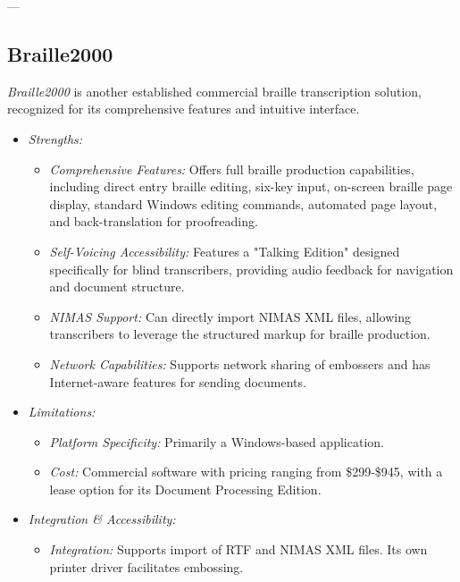 ---

\subsection{Braille2000}
\emph{Braille2000} is another established commercial braille transcription solution, recognized for its comprehensive features and intuitive interface.

\begin{itemize}
    \item \emph{Strengths:}
    \begin{itemize}
        \item \emph{Comprehensive Features:} Offers full braille production capabilities, including direct entry braille editing, six-key input, on-screen braille page display, standard Windows editing commands, automated page layout, and back-translation for proofreading\footnotemark{}.
        \item \emph{Self-Voicing Accessibility:} Features a "Talking Edition" designed specifically for blind transcribers, providing audio feedback for navigation and document structure.
        \item \emph{NIMAS Support:} Can directly import NIMAS XML files, allowing transcribers to leverage the structured markup for braille production\footnotemark{}.
        \item \emph{Network Capabilities:} Supports network sharing of embossers and has Internet-aware features for sending documents.
    \end{itemize}
    \item \emph{Limitations:}
    \begin{itemize}
        \item \emph{Platform Specificity:} Primarily a Windows-based application.
        \item \emph{Cost:} Commercial software with pricing ranging from \$299-\$945, with a lease option for its Document Processing Edition\footnotemark{}.
    \end{itemize}
    \item \emph{Integration \& Accessibility:}
    \begin{itemize}
        \item \emph{Integration:} Supports import of RTF and NIMAS XML files. Its own printer driver facilitates embossing.

\end{itemize}
\end{itemize}
